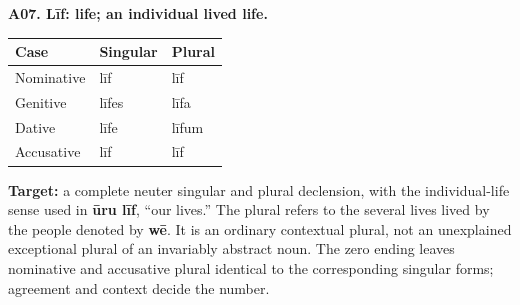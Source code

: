 \par\begin{minipage}{\linewidth}\raggedright
\textbf{A07. Līf: life; an individual lived life.}

\par\begingroup
\fontsize{10.5}{13.2}\selectfont
\setlength{\LTleft}{0pt}\setlength{\LTright}{\fill}
\noindent
\begin{tabular}{@{}>{\raggedright\arraybackslash}p{39.46mm}>{\raggedright\arraybackslash}p{39.46mm}>{\raggedright\arraybackslash}p{39.46mm}@{}}
\toprule
\textbf{Case} & \textbf{Singular} & \textbf{Plural} \\
\midrule
Nominative & līf & līf \\
Genitive & līfes & līfa \\
Dative & līfe & līfum \\
Accusative & līf & līf \\
\bottomrule
\end{tabular}
\par\endgroup

\textbf{Target:} a complete neuter singular and plural declension, with the individual-life sense used in \textbf{ūru līf}, “our lives.” The plural refers to the several lives lived by the people denoted by \textbf{wē}. It is an ordinary contextual plural, not an unexplained exceptional plural of an invariably abstract noun. The zero ending leaves nominative and accusative plural identical to the corresponding singular forms; agreement and context decide the number.

\end{minipage}\par\addvspace{4pt}

